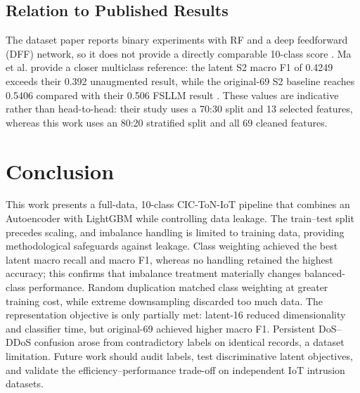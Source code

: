 \documentclass[conference]{IEEEtran}
\begin{document}
\subsection{Relation to Published Results}
The dataset paper reports binary experiments with RF and a deep feedforward (DFF) network, so it does not provide a directly comparable 10-class score \cite{Sarhan2022}. Ma et al. provide a closer multiclass reference: the latent S2 macro F1 of 0.4249 exceeds their 0.392 unaugmented result, while the original-69 S2 baseline reaches 0.5406 compared with their 0.506 FSLLM result \cite{Ma2025FSLLM}. These values are indicative rather than head-to-head: their study uses a 70:30 split and 13 selected features, whereas this work uses an 80:20 stratified split and all 69 cleaned features.

\section{Conclusion}
This work presents a full-data, 10-class CIC-ToN-IoT pipeline that combines an Autoencoder with LightGBM while controlling data leakage. The train--test split precedes scaling, and imbalance handling is limited to training data, providing methodological safeguards against leakage. Class weighting achieved the best latent macro recall and macro F1, whereas no handling retained the highest accuracy; this confirms that imbalance treatment materially changes balanced-class performance. Random duplication matched class weighting at greater training cost, while extreme downsampling discarded too much data. The representation objective is only partially met: latent-16 reduced dimensionality and classifier time, but original-69 achieved higher macro F1. Persistent DoS--DDoS confusion arose from contradictory labels on identical records, a dataset limitation. Future work should audit labels, test discriminative latent objectives, and validate the efficiency--performance trade-off on independent IoT intrusion datasets.

\nocite{*}


\end{document}
